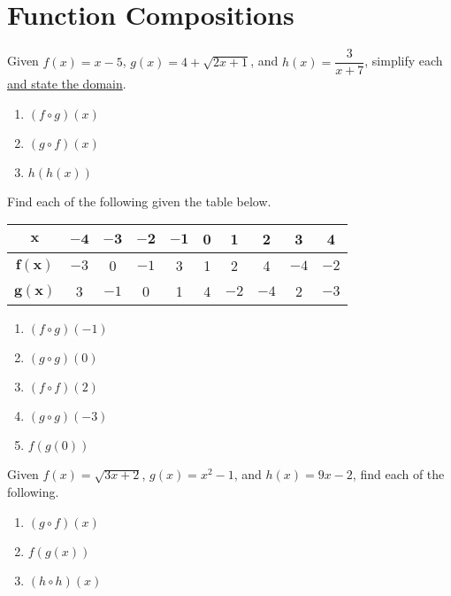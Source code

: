 \chapter{Function Compositions}

Given $f(x) = x - 5$, $g(x) = 4 + \sqrt{2x+1}$, and $h(x) = \dfrac{3}{x+7}$, simplify each \underline{and state the domain}.
\begin{enumerate}
	\item $(f \circ g)(x)$
	\item $(g \circ f)(x)$
	\item $h(h(x))$
\setcounter{Review}{\value{enumi}}
\end{enumerate}

Find each of the following given the table below.
\begin{center}
\begin{tabular}{c|c|c|c|c|c|c|c|c|c}
    $\bm{x}$ & $\bm{-4}$ & $\bm{-3}$ & $\bm{-2}$ & $\bm{-1}$ & \textbf{0} & \textbf{1} & \textbf{2} & \textbf{3} & \textbf{4} \\ \hline
    $\bm{f(x)}$ & $-3$ & 0 & $-1$ & 3 & 1 & 2 & 4 & $-4$ & $-2$ \\ \hline
    $\bm{g(x)}$ & 3 & $-1$ & 0 & 1 & 4 & $-2$ & $-4$ & 2 & $-3$ \\
\end{tabular}
\end{center}

\begin{multicols}{5}
\begin{enumerate}	\setcounter{enumi}{\value{Review}}
\item $(f \circ g)(-1)$
\item $(g \circ g)(0)$
\item $(f \circ f)(2)$
\item $(g \circ g)(-3)$
\item $f(g(0))$
\setcounter{Review}{\value{enumi}}
\end{enumerate}
\end{multicols}

Given $f(x) = \sqrt{3x+2}$, $g(x) = x^2 - 1$, and $h(x) = 9x-2$, find each of the following.
\begin{enumerate}
\setcounter{enumi}{\value{Review}}
\item $(g \circ f)(x)$
\item $f(g(x))$
\item $(h \circ h)(x)$
\setcounter{Review}{\value{enumi}}
\end{enumerate}

